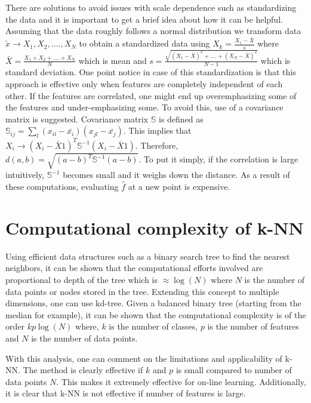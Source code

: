 \documentclass{article}
\begin{document}
There are solutions to avoid issues with scale dependence such as standardizing the data and it is important to get a brief idea about how it can be helpful. Assuming that the data roughly follows a normal distribution we transform data $\utilde{x} \rightarrow X_1, X_2,\dots{.},X_N$ to obtain a standardized data using $X_k = \frac{X_1 - \bar{X}}{s}$ where $\bar{X} = \frac{X_1 + X_2 + \dots{.} + X_N}{N}$ which is mean and $s = \frac{\sqrt{(X_1 - \bar{X})^2 + \dots{.} + (X_N - \bar{X})^2}}{N-1}$ which is standard deviation. One point notice in case of this standardization is that this approach is effective only when features are completely independent of each other. If the features are correlated, one might end up overemphasizing some of the features and under-emphasizing some. To avoid this, use of a covariance matrix is suggested. Covariance matrix $\mathbb{S}$ is defined as $\mathbb{S}_{ij} = \sum_l(x_{il} - \bar{x_i})(x_{jl} - \bar{x_j})$. This implies that $X_i \rightarrow (X_i - \bar{X}1)^T\mathbb{S}^{-1} (X_i - \bar{X}1)$. Therefore, $d(a, b) = \sqrt{(a - b)^T \mathbb{S}^{-1}(a - b)}$. To put it simply, if the correlation is large intuitively, $\mathbb{S}^{-1}$ becomes small and it weighs down the distance. As a result of these computations, evaluating $\hat{f}$ at a new point is expensive.



\section{Computational complexity of k-NN}
Using efficient data structures such as a binary search tree to find the nearest neighbors, it can be shown that the computational efforts involved are proportional to depth of the tree which is $\approx \log(N)$ where $N$ is the number of data points or nodes stored in the tree. Extending this concept to multiple dimensions, one can use kd-tree. Given a balanced binary tree (starting from the median for example), it can be shown that the computational complexity is of the order $kp\log(N)$ where, $k$ is the number of classes, $p$ is the number of features and $N$ is the number of data points. 

With this analysis, one can comment on the limitations and applicability of k-NN. The method is clearly effective if $k$ and $p$ is small compared to number of data points $N$. This makes it extremely effective for on-line learning. Additionally, it is clear that k-NN is not effective if number of features is large. 
\end{document}
